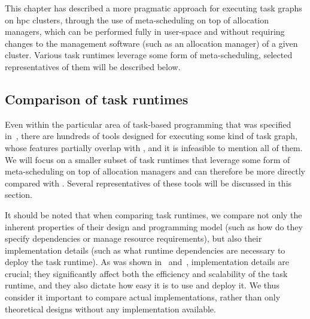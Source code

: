 This chapter has described a more pragmatic approach for executing task graphs on
\gls{hpc} clusters, through the use of meta-scheduling on top of allocation managers,
which can be performed fully in user-space and without requiring changes to the management software
(such as an allocation manager) of a given cluster. Various task runtimes leverage some form of
meta-scheduling, selected representatives of them will be described below.

\subsection{Comparison of task runtimes}
Even within the particular area of task-based programming that was specified
in~, there are hundreds of tools designed for executing some kind of task
graph, whose features partially overlap with \hyperqueue{}, and it is infeasible to
mention all of them. We will focus on a smaller subset of task runtimes that leverage some form of
meta-scheduling on top of allocation managers and can therefore be more directly compared with
\hyperqueue{}. Several representatives of these tools will be discussed in this section.

It should be noted that when comparing task runtimes, we compare not only the inherent properties
of their design and programming model (such as how do they specify dependencies or manage resource
requirements), but also their implementation details (such as what runtime dependencies are
necessary to deploy the task runtime). As was shown in~
and~, implementation details are crucial; they significantly affect both the
efficiency and scalability of the task runtime, and they also dictate how easy it is to use and
deploy it. We thus consider it important to compare actual implementations, rather than only
theoretical designs without any implementation available.



